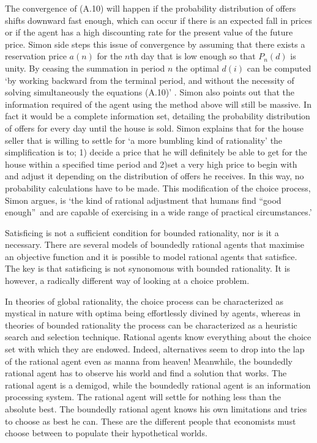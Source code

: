 \documentclass{ucthesis}
\begin{document}
The convergence of (A.10) will happen if the probability distribution of
offers shifts downward fast enough, which can occur if there is an expected
fall in prices or if the agent has a high discounting rate for the present
value of the future price. Simon side steps this issue of convergence by
assuming that there exists a reservation price $a(n)$ for the $n$th day that
is low enough so that $P_{n}\left( d\right) $ is unity. By ceasing the
summation in period $n$ the optimal $d\left( i\right) $ can be computed `by
working backward from the terminal period, and without the necessity of
solving simultaneously the equations (A.10)' \cite[pp. 117]{Simon BMRC}.
Simon also points out that the information required of the agent using the
method above will still be massive. In fact it would be a complete
information set, detailing the probability distribution of offers for every
day until the house is sold. Simon explains that for the house seller that
is willing to settle for `a more bumbling kind of rationality' the
simplification is to; 1) decide a price that he will definitely be able to
get for the house within a specified time period and 2)set a very high price
to begin with and adjust it depending on the distribution of offers he
receives. In this way, no probability calculations have to be made. This
modification of the choice process, Simon argues, is `the kind of rational
adjustment that humans find \textquotedblleft good enough\textquotedblright\
and are capable of exercising in a wide range of practical circumstances.' 
\cite[ibid]{Simon BMRC}

Satisficing is not a sufficient condition for bounded rationality, nor is it
a necessary. There are several models of boundedly rational agents that
maximise an objective function and it is possible to model rational agents
that satisfice. The key is that satisficing is not synonomous with bounded
rationality. It is however, a radically different way of looking at a choice
problem.

In theories of global rationality, the choice process can be characterized
as mystical in nature with optima being effortlessly divined by agents,
whereas in theories of bounded rationality the process can be characterized
as a heuristic search and selection technique. Rational agents know
everything about the choice set with which they are endowed. Indeed,
alternatives seem to drop into the lap of the rational agent even as manna
from heaven! Meanwhile, the boundedly rational agent has to observe his
world and find a solution that works. The rational agent is a demigod, while
the boundedly rational agent is an information processing system. The
rational agent will settle for nothing less than the absolute best. The
boundedly rational agent knows his own limitations and tries to choose as
best he can. These are the different people that economists must choose
between to populate their hypothetical worlds.
\end{document}

